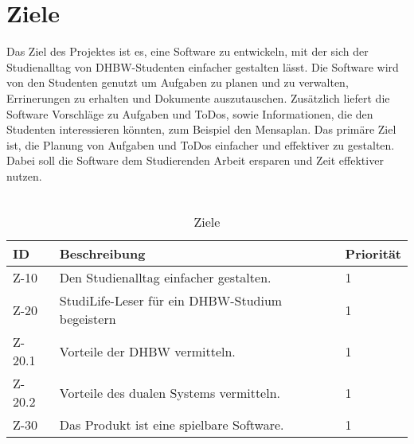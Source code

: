 
\chapter{Ziele}
Das Ziel des Projektes ist es, eine Software zu entwickeln, mit der sich der Studienalltag von DHBW-Studenten einfacher gestalten lässt. Die Software wird von den Studenten genutzt um  Aufgaben zu planen und zu verwalten, Errinerungen zu erhalten und Dokumente auszutauschen. Zusätzlich liefert die Software Vorschläge zu Aufgaben und ToDos, sowie Informationen, die den Studenten interessieren könnten, zum Beispiel den Mensaplan. Das primäre Ziel ist, die Planung von Aufgaben und ToDos einfacher und effektiver zu gestalten. Dabei soll die Software dem Studierenden Arbeit ersparen und Zeit effektiver nutzen. \\\\

\begin{table}[H]
\caption{Ziele}
\label{ziele:entwicklungsziele}
\begin{tabularx}{\textwidth}{|l|X|l|}
\toprule
\textbf{ID} & \textbf{Beschreibung} & \textbf{Priorität}\\
\endhead
\hline
Z-10 & Den Studienalltag einfacher gestalten. & 1 \\
Z-20 & StudiLife-Leser für ein DHBW-Studium begeistern & 1 \\
Z-20.1 & Vorteile der DHBW vermitteln. & 1 \\
Z-20.2 & Vorteile des dualen Systems vermitteln. & 1 \\
Z-30 & Das Produkt ist eine spielbare Software. & 1\\
\hline
\end{tabularx}
\end{table}

